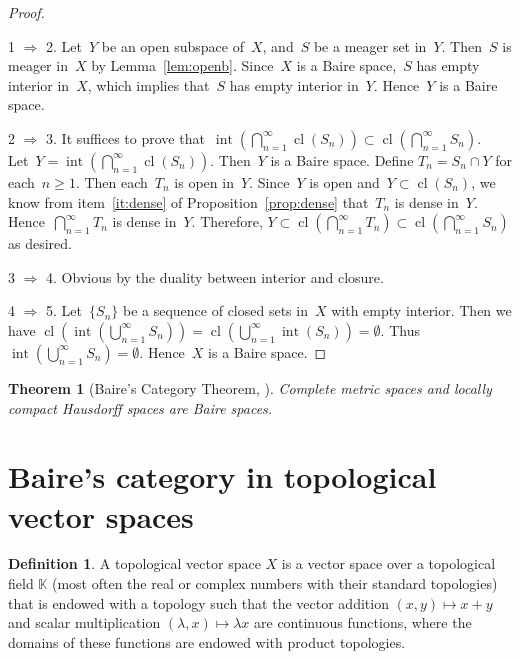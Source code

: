 \documentclass[11pt,a4paper]{article}
\newtheorem{theorem}{Theorem}[section]
\theoremstyle{definition}
\newtheorem{definition}{Definition}[section]
\def\KK{\mathbb{K}}
\DeclareMathOperator{\inter}{int}
\DeclareMathOperator{\cl}{cl}
\numberwithin{equation}{section}
\begin{document}
\begin{proof}~

  1 $\Rightarrow$ 2. Let~$Y$ be an open subspace of~$X$, and~$S$ be a meager set in~$Y$.
  Then~$S$ is meager in~$X$ by Lemma~\ref{lem:openb}. Since~$X$ is a Baire space,~$S$ has empty interior in~$X$, which
  implies that~$S$ has empty interior in~$Y$. Hence~$Y$ is a Baire space. 

  2 $\Rightarrow$ 3. It suffices to prove that~$\inter(\bigcap_{n=1}^\infty \cl(S_n))\subset\cl(\bigcap_{n=1}^\infty S_n)$. 
  Let~$Y=\inter(\bigcap_{n=1}^\infty \cl(S_n))$. Then~$Y$ is a Baire space. 
  Define $T_n = S_n\cap Y$ for each~$n\ge 1$. Then each~$T_n$ is open in~$Y$. Since~$Y$ is open
  and~$Y\subset \cl(S_n)$, we know from item~\ref{it:dense} of Proposition~\ref{prop:dense}
  that~$T_n$ is dense in~$Y$. Hence~$\bigcap_{n=1}^\infty T_n$
  is dense in~$Y$. Therefore, $Y \subset \cl(\bigcap_{n=1}^\infty T_n) \subset
  \cl(\bigcap_{n=1}^\infty S_n)$ as desired. 

  3 $\Rightarrow$ 4. Obvious by the duality between interior and closure. 

  4 $\Rightarrow$ 5. Let~$\{S_n\}$ be a sequence of closed sets in~$X$ with empty interior. Then we
    have
  $\cl(\inter(\bigcup_{n=1}^\infty S_n)) = \cl(\bigcup_{n=1}^\infty \inter(S_n)) = \emptyset$.
  Thus~$\inter(\bigcup_{n=1}^\infty S_n) = \emptyset$. Hence~$X$ is a Baire space. 
\end{proof}


\begin{theorem}[Baire's Category Theorem, {\cite[Theorem~48.2]{Munkres_2000}}]
  \label{th:Baire}
  Complete metric spaces and locally compact Hausdorff spaces are Baire spaces.
\end{theorem}


\section{Baire's category in topological vector spaces}

\begin{definition}
 A topological vector space $X$ is a vector space over a topological field $\KK$ (most often the
 real or complex numbers with their standard topologies) that is endowed with a topology such that
 the vector addition $(x,y)\mapsto x+y$ and scalar multiplication $(\lambda, x) \mapsto \lambda x$ are continuous functions, where the domains of these
 functions are endowed with product topologies.
\end{definition}
\end{document}
